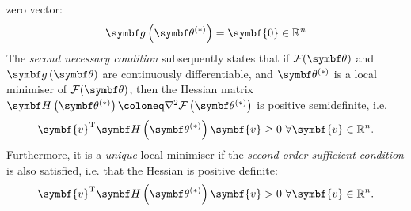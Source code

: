 zero vector:
\begin{equation}
    \bdgthstar = \symbf{0} \in \mathbb{R}^n
\end{equation}
The \emph{second necessary condition} subsequently states that
if $\Fth$ and $\bdgth$ are continuously differentiable, and $\bthstar$ is a
local minimiser of $\Fth$, then the Hessian matrix $\bdHthstar \coloneq
\nabla^2 \Fthstar$ is positive semidefinite, i.e.
\begin{equation}
  \symbf{v}^{\mathrm{T}} \bdHthstar \symbf{v} \geq 0\ \forall \symbf{v} \in \mathbb{R}^n.
\end{equation}
Furthermore, it is a \emph{unique} local minimiser if the \emph{second-order
sufficient condition} is also satisfied, i.e. that the Hessian is positive
definite:
\begin{equation}
    \symbf{v}^{\mathrm{T}} \bdHthstar \symbf{v} > 0\ \forall \symbf{v} \in \mathbb{R}^n.
\end{equation}


